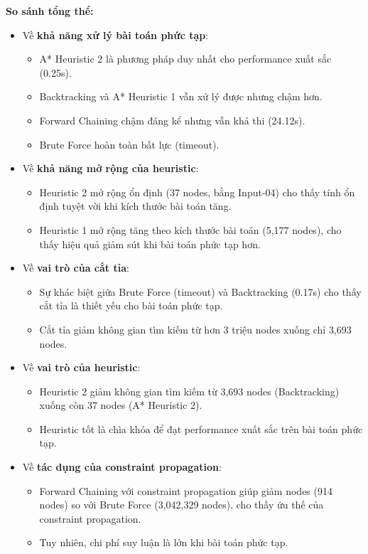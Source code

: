 \textbf{So sánh tổng thể:}

\begin{itemize}
    \item Về \textbf{khả năng xử lý bài toán phức tạp}:
    \begin{itemize}
        \item A* Heuristic 2 là phương pháp duy nhất cho performance xuất sắc (0.25s).
        \item Backtracking và A* Heuristic 1 vẫn xử lý được nhưng chậm hơn.
        \item Forward Chaining chậm đáng kể nhưng vẫn khả thi (24.12s).
        \item Brute Force hoàn toàn bất lực (timeout).
    \end{itemize}
    
    \item Về \textbf{khả năng mở rộng của heuristic}:
    \begin{itemize}
        \item Heuristic 2 mở rộng ổn định (37 nodes, bằng Input-04) cho thấy tính ổn định tuyệt vời khi kích thước bài toán tăng.
        \item Heuristic 1 mở rộng tăng theo kích thước bài toán (5,177 nodes), cho thấy hiệu quả giảm sút khi bài toán phức tạp hơn.
    \end{itemize}
    
    \item Về \textbf{vai trò của cắt tỉa}:
    \begin{itemize}
        \item Sự khác biệt giữa Brute Force (timeout) và Backtracking (0.17s) cho thấy cắt tỉa là thiết yếu cho bài toán phức tạp.
        \item Cắt tỉa giảm không gian tìm kiếm từ hơn 3 triệu nodes xuống chỉ 3,693 nodes.
    \end{itemize}
    
    \item Về \textbf{vai trò của heuristic}:
    \begin{itemize}
        \item Heuristic 2 giảm không gian tìm kiếm từ 3,693 nodes (Backtracking) xuống còn 37 nodes (A* Heuristic 2).
        \item Heuristic tốt là chìa khóa để đạt performance xuất sắc trên bài toán phức tạp.
    \end{itemize}
    
    \item Về \textbf{tác dụng của constraint propagation}:
    \begin{itemize}
        \item Forward Chaining với constraint propagation giúp giảm nodes (914 nodes) so với Brute Force (3,042,329 nodes), cho thấy ứu thế của constraint propagation.
        \item Tuy nhiên, chi phí suy luận là lớn khi bài toán phức tạp.
    \end{itemize}
\end{itemize}

